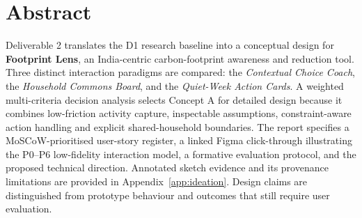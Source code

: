 \documentclass[12pt,a4paper]{article}
\begin{document}
\section*{Abstract}
Deliverable 2 translates the D1 research baseline into a conceptual design for \textbf{Footprint Lens}, an India-centric carbon-footprint awareness and reduction tool. Three distinct interaction paradigms are compared: the \emph{Contextual Choice Coach}, the \emph{Household Commons Board}, and the \emph{Quiet-Week Action Cards}. A weighted multi-criteria decision analysis selects Concept A for detailed design because it combines low-friction activity capture, inspectable assumptions, constraint-aware action handling and explicit shared-household boundaries. The report specifies a MoSCoW-prioritised user-story register, a linked Figma click-through illustrating the P0--P6 low-fidelity interaction model, a formative evaluation protocol, and the proposed technical direction. Annotated sketch evidence and its provenance limitations are provided in Appendix~\ref{app:ideation}. Design claims are distinguished from prototype behaviour and outcomes that still require user evaluation.
\end{document}
